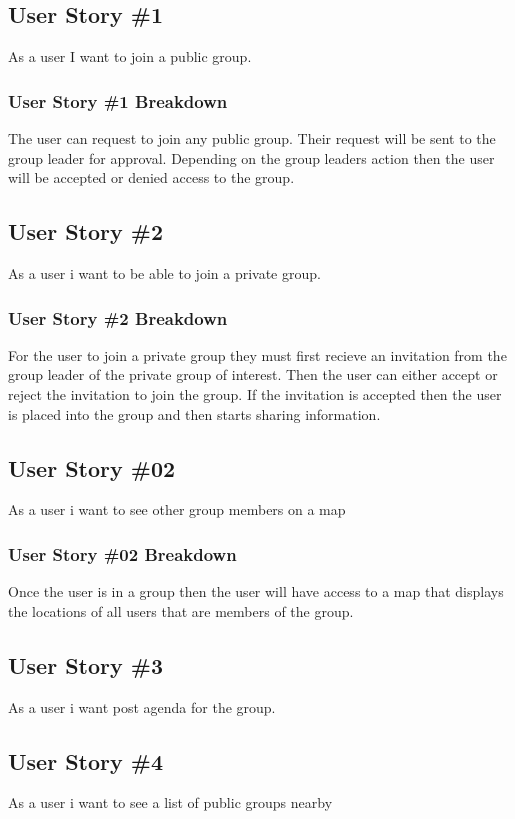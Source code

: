 \subsection{User Story \#1 }
As a user I want to join a public group.

\subsubsection{User Story \#1 Breakdown}
The user can request to join any public group.  Their request will be sent to the group leader for approval.  Depending on the group leaders action then the user will be accepted or denied access to the group. 

\subsection{User Story \#2 }
As a user i want to be able to join a private group.

\subsubsection{User Story \#2 Breakdown}
For the user to join a private group they must first recieve an invitation from the group leader of the private group of interest.  Then the user can either accept or reject the invitation to join the group.  If the invitation is accepted then the user is placed into the group and then starts sharing information. 

\subsection{User Story \#02} 
As a user i want to see other group members on a map

\subsubsection{User Story \#02 Breakdown}
Once the user is in a group then the user will have access to a map that displays the locations of all users that are members of the group.

\subsection{User Story \#3} 
As a user i want post agenda for the group.

\subsection{User Story \#4} 
As a user i want to see a list of public groups nearby

